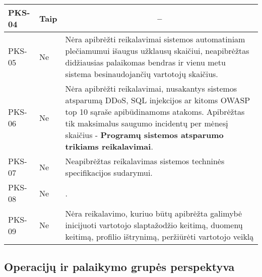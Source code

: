 \documentclass{VUMIFPSkursinis}
\begin{document}
\begin{center}
\begin{longtable}{|C{2cm}|L{2.5cm}|L{10cm}|}
		PKS-04                                          &
		Taip                                            &
		                                                                                                                                                                                                                                           \\ \hline
		PKS-05                                          &
		Ne                                              &
		Nėra apibrėžti reikalavimai sistemos automatiniam plečiamumui išaugus užklausų skaičiui, neapibrėžtas didžiausias palaikomas bendras ir vienu metu sistema besinaudojančių vartotojų skaičius.                                                                     \\ \hline
		PKS-06                                          &
		Ne                                              &
		Nėra apibrėžti reikalavimai, nusakantys sistemos atsparumą DDoS, SQL injekcijos ar kitoms OWASP top 10 sąraše apibūdinamoms atakoms. Apibrėžtas tik maksimalus saugumo incidentų per mėnesį skaičius - \textbf{Programų sistemos atsparumo trikiams reikalavimai}. \\ \hline
		PKS-07                                          &
		Ne                                              &
		Neapibrėžtas reikalavimas sistemos techninės specifikacijos sudarymui.                                                                                                                                                                                             \\ \hline
		PKS-08                                          &
		Ne                                              &
		\textbf{}.                                                                                                                                                                                \\ \hline
		PKS-09                                          &
		Ne                                              &
		Nėra reikalavimo, kuriuo būtų apibrėžta galimybė inicijuoti vartotojo slaptažodžio keitimą, duomenų keitimą, profilio ištrynimą, peržiūrėti vartotojo veiklą                                                                                                       \\ \hline
	\end{longtable}
\end{center}

\subsection{Operacijų ir palaikymo grupės perspektyva}
\end{document}
